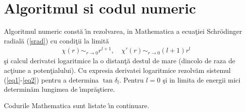 \chapter{Algoritmul si codul numeric}

Algoritmul numeric const\u a \^{\i}n rezolvarea, in Mathematica a ecua\c tiei Schr\"odinger radial\u a (\ref{srad})  cu condi\c tii la limit\u a
\begin{align}
  \chi(r)\mathop{\sim}_{r\rightarrow 0}r^{l+1},\quad 
  \chi'(r)\mathop{\sim}_{r\rightarrow 0}(l+1)r^{l}
\end{align}
\c si calcul derivatei logaritmice la o distan\c t\u a destul de mare (dincolo de raza de ac\c tiune a poten\c tialului). Cu expresia derivatei logaritmice rezolv\u am sistemul (\ref{eq1}-\ref{eq2}) pentru a determina $\tan\delta_l$. Pentru $l=0$ \c si in limita de energii mici determin\u am lungimea de \^{\i}mpr\u a\c stiere.

Codurile Mathematica sunt listate \^{\i}n continuare.
